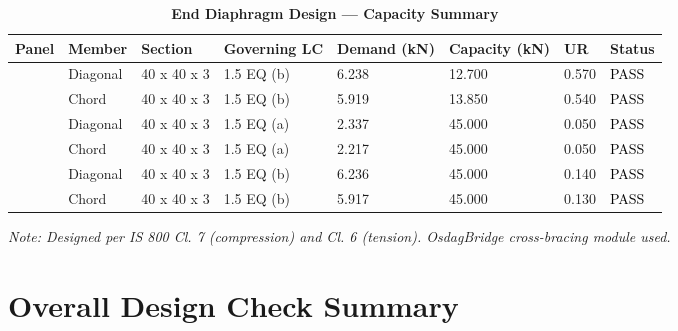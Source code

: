 \documentclass[12pt,a4paper]{report}
\numberwithin{table}{chapter}
\numberwithin{figure}{chapter}
\begin{document}
\vspace{1em}

\begin{longtable}{|C{2.0cm}|L{1.8cm}|C{2.2cm}|C{3.0cm}|C{1.8cm}|C{1.8cm}|C{1.2cm}|C{1.8cm}|}
\caption{\textbf{End Diaphragm Design --- Capacity Summary}}
\hline
\textbf{Panel} & \textbf{Member} & \textbf{Section} & \textbf{Governing LC} & \textbf{Demand (kN)} & \textbf{Capacity (kN)} & \textbf{UR} & \textbf{Status} \\[6pt]
\hline
{} & Diagonal & 40 x 40 x 3 & 1.5 EQ (b) & 6.238 & 12.700 & 0.570 & \textcolor{black}{PASS} \\[6pt]
 & Chord & 40 x 40 x 3 & 1.5 EQ (b) & 5.919 & 13.850 & 0.540 & \textcolor{black}{PASS} \\[6pt]
\hline
{} & Diagonal & 40 x 40 x 3 & 1.5 EQ (a) & 2.337 & 45.000 & 0.050 & \textcolor{black}{PASS} \\[6pt]
 & Chord & 40 x 40 x 3 & 1.5 EQ (a) & 2.217 & 45.000 & 0.050 & \textcolor{black}{PASS} \\[6pt]
\hline
{} & Diagonal & 40 x 40 x 3 & 1.5 EQ (b) & 6.236 & 45.000 & 0.140 & \textcolor{black}{PASS} \\[6pt]
 & Chord & 40 x 40 x 3 & 1.5 EQ (b) & 5.917 & 45.000 & 0.130 & \textcolor{black}{PASS} \\[6pt]
\hline
\end{longtable}
\noindent\textit{Note: Designed per IS 800 Cl. 7 (compression) and Cl. 6 (tension). OsdagBridge cross-bracing module used.}

\section{Overall Design Check Summary}
\label{sec:overall-summary}
\end{document}
